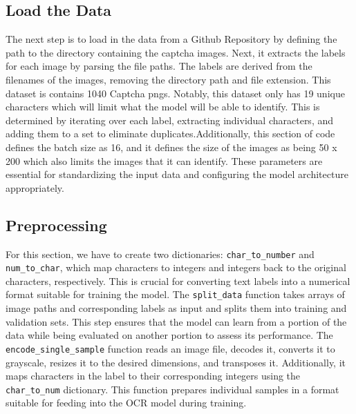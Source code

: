 \documentclass[10pt,twocolumn]{article}
\begin{document}
\subsection{Load the Data}
The next step is to load in the data from a Github Repository by defining the path to the directory containing the captcha images. Next, it extracts the labels for each image by parsing the file paths. The labels are derived from the filenames of the images, removing the directory path and file extension. This dataset is contains 1040 Captcha pngs. Notably, this dataset only has 19 unique characters which will limit what the model will be able to identify. This is determined by iterating over each label, extracting individual characters, and adding them to a set to eliminate duplicates.Additionally, this section of code defines the batch size as 16, and it defines the size of the images as being 50 x 200 which also limits the images that it can identify. These parameters are essential for standardizing the input data and configuring the model architecture appropriately.


\subsection{Preprocessing}
For this section, we have to create two dictionaries: \texttt{char\_to\_number} and \texttt{num\_to\_char}, which map characters to integers and integers back to the original characters, respectively. This is crucial for converting text labels into a numerical format suitable for training the model. The \texttt{split\_data} function takes arrays of image paths and corresponding labels as input and splits them into training and validation sets. This step ensures that the model can learn from a portion of the data while being evaluated on another portion to assess its performance. The \texttt{encode\_single\_sample} function reads an image file, decodes it, converts it to grayscale, resizes it to the desired dimensions, and transposes it. Additionally, it maps characters in the label to their corresponding integers using the \texttt{char\_to\_num} dictionary. This function prepares individual samples in a format suitable for feeding into the OCR model during training.
\end{document}
